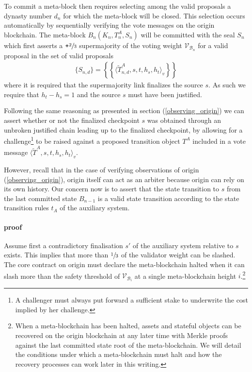 \documentclass[12pt,a4paper]{article}
\begin{document}
To commit a meta-block then requires selecting among the valid proposals a dynasty number $d_n$ for which the meta-block will be closed. This selection occurs automatically by sequentially verifying the vote messages on the origin blockchain.
The meta-block $B_n(K_n, T^A_n, S_n)$ will be committed with the seal $S_n$ which first asserts a $\texttt{+}\sfrac{2}{3}$ supermajority of the voting weight $\mathcal{V}_{\mathcal{B}_n}$ for a valid proposal in the set of valid proposals
\begin{align*}
  \{S_{n,d}\} = \left\{\left\{\langle\tilde{T}^A_{n,d}, s, t, h_s, h_t\rangle_v\right\}\right\}
\end{align*}
where it is required that the supermajority link finalizes the source $s$.
As such we require that $h_t - h_s = 1$ and the source $s$ must have been justified.

Following the same reasoning as presented in section (\ref{observing_origin}) we can assert whether or not the finalized checkpoint $s$ was obtained through an unbroken justified chain leading up to the finalized checkpoint, by allowing for a challenge\footnote{A challenger must always put forward a sufficient stake to underwrite the cost implied by her challenge.} to be raised against a proposed transition object $T^A$ included in a vote message $\langle\tilde{T}^A, s, t, h_s, h_t\rangle_v$.

However, recall that in the case of verifying observations of origin (\ref{observing_origin}), origin itself can act as an arbiter because origin can rely on its own history.
Our concern now is to assert that the state transition to $s$ from the last committed state $B_{n-1}$ is a valid state transition according to the state transition rules $t_A$ of the auxiliary system.

\paragraph{proof} Assume first a contradictory finalisation $s'$ of the auxiliary system relative to $s$ exists. This implies that more than $\sfrac{1}{3}$ of the validator weight can be slashed.
The core contract on origin must declare the meta-blockchain halted when it can slash more than the safety threshold of $\mathcal{V}_{\mathcal{B}_i}$ at a single meta-blockchain height $i$.\footnote{When a meta-blockchain has been halted, assets and stateful objects can be recovered on the origin blockchain at any later time with Merkle proofs against the last committed state root of the meta-blockchain.
We will detail the conditions under which a meta-blockchain must halt and how the recovery processes can work later in this writing.}
\end{document}

